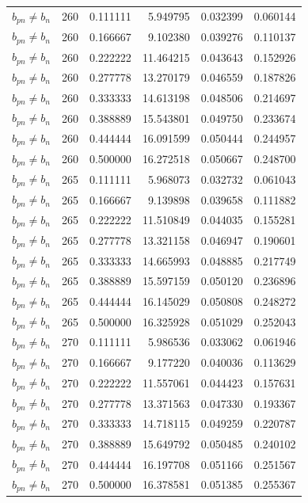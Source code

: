 \begin{longtable}{l r r r r r}
$b_{pn} \neq b_n$ & 260 & 0.111111 & 5.949795 & 0.032399 & 0.060144 \\
$b_{pn} \neq b_n$ & 260 & 0.166667 & 9.102380 & 0.039276 & 0.110137 \\
$b_{pn} \neq b_n$ & 260 & 0.222222 & 11.464215 & 0.043643 & 0.152926 \\
$b_{pn} \neq b_n$ & 260 & 0.277778 & 13.270179 & 0.046559 & 0.187826 \\
$b_{pn} \neq b_n$ & 260 & 0.333333 & 14.613198 & 0.048506 & 0.214697 \\
$b_{pn} \neq b_n$ & 260 & 0.388889 & 15.543801 & 0.049750 & 0.233674 \\
$b_{pn} \neq b_n$ & 260 & 0.444444 & 16.091599 & 0.050444 & 0.244957 \\
$b_{pn} \neq b_n$ & 260 & 0.500000 & 16.272518 & 0.050667 & 0.248700 \\
$b_{pn} \neq b_n$ & 265 & 0.111111 & 5.968073 & 0.032732 & 0.061043 \\
$b_{pn} \neq b_n$ & 265 & 0.166667 & 9.139898 & 0.039658 & 0.111882 \\
$b_{pn} \neq b_n$ & 265 & 0.222222 & 11.510849 & 0.044035 & 0.155281 \\
$b_{pn} \neq b_n$ & 265 & 0.277778 & 13.321158 & 0.046947 & 0.190601 \\
$b_{pn} \neq b_n$ & 265 & 0.333333 & 14.665993 & 0.048885 & 0.217749 \\
$b_{pn} \neq b_n$ & 265 & 0.388889 & 15.597159 & 0.050120 & 0.236896 \\
$b_{pn} \neq b_n$ & 265 & 0.444444 & 16.145029 & 0.050808 & 0.248272 \\
$b_{pn} \neq b_n$ & 265 & 0.500000 & 16.325928 & 0.051029 & 0.252043 \\
$b_{pn} \neq b_n$ & 270 & 0.111111 & 5.986536 & 0.033062 & 0.061946 \\
$b_{pn} \neq b_n$ & 270 & 0.166667 & 9.177220 & 0.040036 & 0.113629 \\
$b_{pn} \neq b_n$ & 270 & 0.222222 & 11.557061 & 0.044423 & 0.157631 \\
$b_{pn} \neq b_n$ & 270 & 0.277778 & 13.371563 & 0.047330 & 0.193367 \\
$b_{pn} \neq b_n$ & 270 & 0.333333 & 14.718115 & 0.049259 & 0.220787 \\
$b_{pn} \neq b_n$ & 270 & 0.388889 & 15.649792 & 0.050485 & 0.240102 \\
$b_{pn} \neq b_n$ & 270 & 0.444444 & 16.197708 & 0.051166 & 0.251567 \\
$b_{pn} \neq b_n$ & 270 & 0.500000 & 16.378581 & 0.051385 & 0.255367 \\

\end{longtable}

